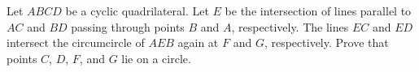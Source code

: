 Let $ABCD$ be a cyclic quadrilateral. Let $E$ be the intersection of lines parallel to $AC$ and $BD$ passing through points $B$ and $A$,  respectively. The lines $EC$ and $ED$ intersect the circumcircle of $AEB$ again at $F$ and $G$,  respectively. Prove that points $C$,  $D$,  $F$,  and $G$ lie on a circle.